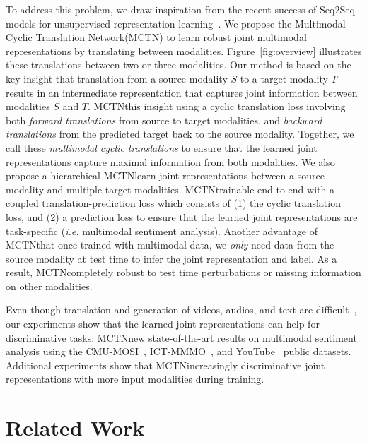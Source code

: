 \documentclass[letterpaper]{article} %
\newcommand{\citep}{\cite}
\newcommand{\ourl}{Multimodal Cyclic Translation Network}
\newcommand{\ours}{MCTN}
\begin{document}
To address this problem, we draw inspiration from the recent success of Seq2Seq models for unsupervised representation learning~\citep{seq2seq_nn,DBLP:journals/corr/TuLSLL16}. We propose the \ourl \model (\ours) to learn robust joint multimodal representations by translating between modalities. Figure~\ref{fig:overview} illustrates these translations between two or three modalities. Our method is based on the key insight that translation from a source modality $S$ to a target modality $T$ results in an intermediate representation that captures joint information between modalities $S$ and $T$. \ours \extends this insight using a cyclic translation loss involving both \textit{forward translations} from source to target modalities, and \textit{backward translations} from the predicted target back to the source modality. Together, we call these \textit{multimodal cyclic translations} to ensure that the learned joint representations capture maximal information from both modalities. We also propose a hierarchical \ours \to learn joint representations between a source modality and multiple target modalities. \ours \is trainable end-to-end with a coupled translation-prediction loss which consists of (1) the cyclic translation loss, and (2) a prediction loss to ensure that the learned joint representations are task-specific (\textit{i.e.} multimodal sentiment analysis). Another advantage of \ours \is that once trained with multimodal data, we \textit{only} need data from the source modality at test time to infer the joint representation and label. As a result, \ours \is completely robust to test time perturbations or missing information on other modalities.

Even though translation and generation of videos, audios, and text are difficult~\citep{DBLP:journals/corr/abs-1710-00421}, our experiments show that the learned joint representations can help for discriminative tasks: \ours \achieves new state-of-the-art results on multimodal sentiment analysis using the CMU-MOSI~\citep{zadeh2016multimodal}, ICT-MMMO~\citep{wollmer2013youtube}, and YouTube~\citep{morency2011towards} public datasets. Additional experiments show that \ours \learns increasingly discriminative joint representations with more input modalities during training. 

\section{Related Work}
\end{document}

